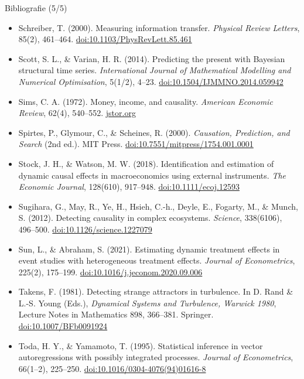 \begin{frame}{Bibliografie (5/5)}
\itemsize{\tiny}
\begin{itemize}
    \item Schreiber, T. (2000). Measuring information transfer. \textit{Physical Review Letters}, 85(2), 461--464. \href{https://doi.org/10.1103/PhysRevLett.85.461}{doi:10.1103/PhysRevLett.85.461}
    \item Scott, S. L., \& Varian, H. R. (2014). Predicting the present with Bayesian structural time series. \textit{International Journal of Mathematical Modelling and Numerical Optimisation}, 5(1/2), 4--23. \href{https://doi.org/10.1504/IJMMNO.2014.059942}{doi:10.1504/IJMMNO.2014.059942}
    \item Sims, C. A. (1972). Money, income, and causality. \textit{American Economic Review}, 62(4), 540--552. \href{https://www.jstor.org/stable/1806097}{jstor.org}
    \item Spirtes, P., Glymour, C., \& Scheines, R. (2000). \textit{Causation, Prediction, and Search} (2nd ed.). MIT Press. \href{https://doi.org/10.7551/mitpress/1754.001.0001}{doi:10.7551/mitpress/1754.001.0001}
    \item Stock, J. H., \& Watson, M. W. (2018). Identification and estimation of dynamic causal effects in macroeconomics using external instruments. \textit{The Economic Journal}, 128(610), 917--948. \href{https://doi.org/10.1111/ecoj.12593}{doi:10.1111/ecoj.12593}
    \item Sugihara, G., May, R., Ye, H., Hsieh, C.-h., Deyle, E., Fogarty, M., \& Munch, S. (2012). Detecting causality in complex ecosystems. \textit{Science}, 338(6106), 496--500. \href{https://doi.org/10.1126/science.1227079}{doi:10.1126/science.1227079}
    \item Sun, L., \& Abraham, S. (2021). Estimating dynamic treatment effects in event studies with heterogeneous treatment effects. \textit{Journal of Econometrics}, 225(2), 175--199. \href{https://doi.org/10.1016/j.jeconom.2020.09.006}{doi:10.1016/j.jeconom.2020.09.006}
    \item Takens, F. (1981). Detecting strange attractors in turbulence. In D. Rand \& L.-S. Young (Eds.), \textit{Dynamical Systems and Turbulence, Warwick 1980}, Lecture Notes in Mathematics 898, 366--381. Springer. \href{https://doi.org/10.1007/BFb0091924}{doi:10.1007/BFb0091924}
    \item Toda, H. Y., \& Yamamoto, T. (1995). Statistical inference in vector autoregressions with possibly integrated processes. \textit{Journal of Econometrics}, 66(1--2), 225--250. \href{https://doi.org/10.1016/0304-4076(94)01616-8}{doi:10.1016/0304-4076(94)01616-8}

\end{itemize}
\end{frame}
